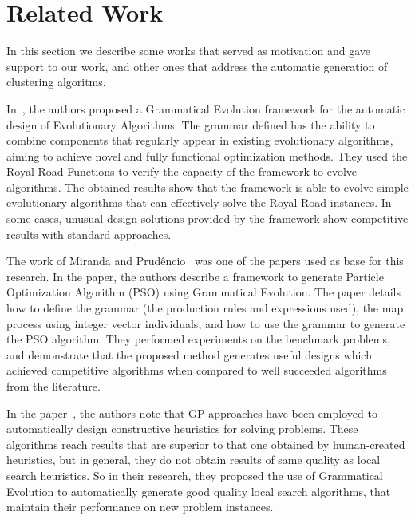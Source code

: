 \documentclass[conference,compsoc]{IEEEtran}
\begin{document}

\section{Related Work} \label{sec:related_work}

In this section we describe some works that served as motivation and gave support to our work, and other ones that address the automatic generation of clustering algoritms.  


In~\cite{lourencco2012evolving,lourencco2015IEEE}, the authors proposed a Grammatical Evolution framework for the automatic design of Evolutionary Algorithms. The grammar defined has the ability to combine components that regularly appear in existing evolutionary algorithms, aiming to achieve novel and fully functional optimization methods. They used the Royal Road Functions to verify the capacity of the framework to evolve algorithms. The obtained results show that the framework is able to evolve simple evolutionary algorithms that can effectively solve the Royal Road instances. In some cases, unusual design solutions provided by the framework show competitive results with standard approaches.

The work of Miranda and Prud\^encio~\cite{miranda2015gefpso} was one of the papers used as base for this research. In the paper, the authors describe a framework to generate Particle Optimization Algorithm (PSO) using Grammatical Evolution. The paper details how to define the grammar (the production rules and expressions used), the map process using integer vector individuals, and how to use the grammar to generate the PSO algorithm. They performed experiments on the benchmark problems, and demonstrate that the proposed method generates useful designs which achieved competitive algorithms when compared to well succeeded algorithms from the literature.

In the paper~\cite{burke2012grammatical}, the authors note that GP approaches have been employed to automatically design constructive heuristics for solving problems. These algorithms reach results that are superior to that one obtained by human-created heuristics, but in general, they do not obtain results of same quality as local search heuristics. So in their research, they proposed the use of Grammatical Evolution to automatically generate good quality local search algorithms, that maintain their performance on new problem instances.
\end{document}
